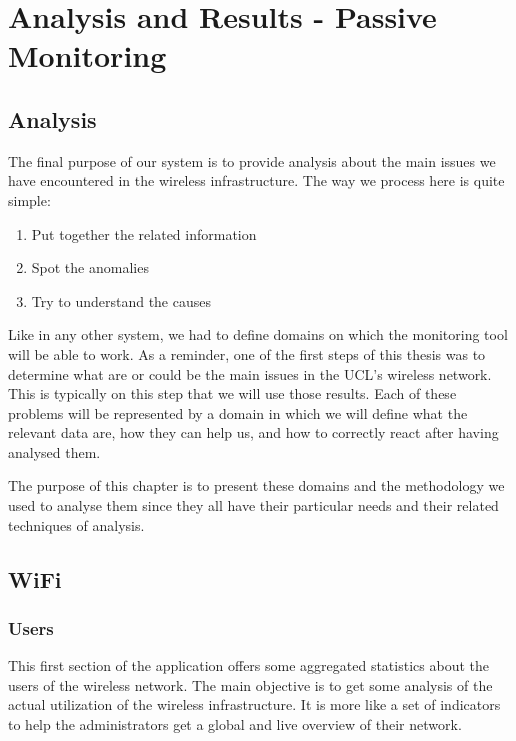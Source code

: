
\chapter{Analysis and Results - Passive Monitoring} %

\label{Chapter5} %


\section{Analysis}
The final purpose of our system is to provide analysis about the main issues we have encountered in the wireless infrastructure. The way we process here is quite simple:

\begin{enumerate}
\item Put together the related information
\item Spot the anomalies
\item Try to understand the causes
\end{enumerate}
Like in any other system, we had to define domains on which the monitoring tool will be able to work. As a reminder, one of the first steps of this thesis was to determine what are or could be the main issues in the UCL's wireless network. This is typically on this step that we will use those results. Each of these problems will be represented by a domain in which we will define what the relevant data are, how they can help us, and how to correctly react after having analysed them. 

The purpose of this chapter is to present these domains and the methodology we used to analyse them since they all have their particular needs and their related techniques of analysis.

\section{WiFi}

\subsection{Users}
This first section of the application offers some aggregated statistics about the users of the wireless network. The main objective is to get some analysis of the actual utilization of the wireless infrastructure. It is more like a set of indicators to help the administrators get a global and live overview of their network. 

